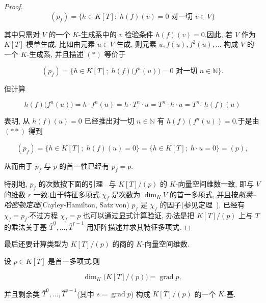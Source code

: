 \begin{proof}
\begin{equation}
(p_f) = \big\{h \in K[T];\; h(f)(v) = 0 \text{ 对一切 } v \in V\big\} \tag{$(*)$}\end{equation}

其中只需对 $V$ 的一个 $K$-生成系中的 $v$ 检验条件 $h(f)(v) = 0$.因此, 若 $V$ 作为 $K[T]$-模单生成, 比如由元素 $u \in V$ 生成, 则元素 $u, f(u), f^2(u), \ldots$ 构成 $V$ 的一个 $K$-生成系, 并且描述 $(*)$ 等价于

\begin{equation}
(p_f) = \big\{h \in K[T];\; h(f)\big(f^n(u)\big) = 0 \text{ 对一切 } n \in \mathbb{N}\big\} \text{.}\tag{$(**)$}\end{equation}

但计算

\[
h(f)\big(f^n(u)\big) = h \cdot f^n(u) = h \cdot T^n \cdot u = T^n \cdot h \cdot u = T^n \cdot h(f)(u)\]

表明, 从 $h(f)(u) = 0$ 已经推出对一切 $n \in \mathbb{N}$ 有 $h(f)(f^n(u)) = 0$.于是由 $(**)$ 得到

\[
(p_f) = \big\{h \in K[T];\; h(f)(u) = 0\big\} = \big\{h \in K[T];\; h \cdot u = 0\big\} = (p),\]

从而由于 $p_f$ 与 $p$ 的首一性已经有 $p_f = p$.

特别地, $p_f$ 的次数按下面的引理~ 与 $K[T]/(p)$ 的 $K$-向量空间维数一致, 即与 $V$ 的维数 $r$ 一致.由于特征多项式 $\chi_f$ 是次数为 $\dim_K V$ 的首一多项式, 并且按\emph{凯莱--哈密顿定理}(\textup{Cayley-Hamilton, Satz von}) $p_f$ 是 $\chi_f$ 的因子(参见定理~), 已经有 $\chi_f = p_f$.不过方程 $\chi_f = p$ 也可以通过显式计算验证, 办法是把 $K[T]/(p)$ 上与 $T$ 的乘法关于基 $\bar{T}^0, \ldots, \bar{T}^{r-1}$ 用矩阵描述并求其特征多项式.
\end{proof}

最后还要计算类型为 $K[T]/(p)$ 的商的 $K$-向量空间维数.

\begin{lemma}\label{lem:6.5.5}
设 $p \in K[T]$ 是首一多项式.则

\[
\dim_K\big(K[T]/(p)\big) = \operatorname{grad} p,\]

并且剩余类 $\bar{T}^0, \ldots, \bar{T}^{s - 1}$(其中 $s = \operatorname{grad} p$) 构成 $K[T]/(p)$ 的一个 $K$-基.
\end{lemma}


